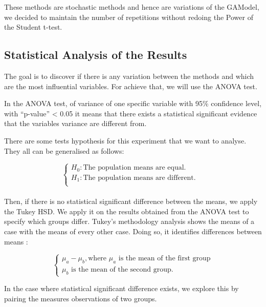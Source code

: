 These methods are stochastic methods and hence are variations of the GAModel, we decided to maintain the number of repetitions without redoing the Power of the Student t-test.

\subsection{Statistical Analysis of the Results}\label{anova}

The goal is to discover if there is any variation between the methods and which are the most influential variables. For achieve that, we will use the ANOVA test.

In the ANOVA test, of variance of one specific variable with 95\% confidence level, with ``p-value'' < 0.05 it means that there exists a statistical significant evidence that the variables variance are different from.

There are some tests hypothesis for this experiment that we want to analyse. They all can be generalised as follows:

$$\begin{cases} H_0: \text{The population means are equal.} &\\
H_1: \text{The population means are different.}&\\
\end{cases}$$\\

Then, if there is no statistical significant difference between the means, we apply the Tukey HSD. We apply it on the results obtained from the ANOVA test to specify which groups differ. Tukey's methodology analysis shows the means of a case with the means of every other case. Doing so, it identifies differences between means :

$$\begin{cases}
\mu_a-\mu_b, \text{where $\mu_a$ is the mean of the first group}\\
                \text{$\mu_b$ is the mean of the second group.}
\end{cases}$$

In the case where statistical significant difference exists, we
explore this by pairing the measures observations of two
groups.


